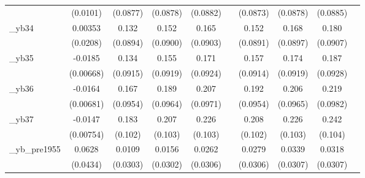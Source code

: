 \begin{table}[htbp]
\begin{tabular}{l*{9}{c}}
            &    (0.0101)         &    (0.0877)         &    (0.0878)         &    (0.0882)         &                     &    (0.0873)         &    (0.0878)         &    (0.0885)         &                     \\
[1em]
\_yb34       &     0.00353         &       0.132         &       0.152\sym{*}  &       0.165\sym{*}  &                     &       0.152\sym{*}  &       0.168\sym{*}  &       0.180\sym{**} &                     \\
            &    (0.0208)         &    (0.0894)         &    (0.0900)         &    (0.0903)         &                     &    (0.0891)         &    (0.0897)         &    (0.0907)         &                     \\
[1em]
\_yb35       &     -0.0185\sym{***}&       0.134         &       0.155\sym{*}  &       0.171\sym{*}  &                     &       0.157\sym{*}  &       0.174\sym{*}  &       0.187\sym{**} &                     \\
            &   (0.00668)         &    (0.0915)         &    (0.0919)         &    (0.0924)         &                     &    (0.0914)         &    (0.0919)         &    (0.0928)         &                     \\
[1em]
\_yb36       &     -0.0164\sym{**} &       0.167\sym{*}  &       0.189\sym{*}  &       0.207\sym{**} &                     &       0.192\sym{**} &       0.206\sym{**} &       0.219\sym{**} &                     \\
            &   (0.00681)         &    (0.0954)         &    (0.0964)         &    (0.0971)         &                     &    (0.0954)         &    (0.0965)         &    (0.0982)         &                     \\
[1em]
\_yb37       &     -0.0147\sym{*}  &       0.183\sym{*}  &       0.207\sym{**} &       0.226\sym{**} &                     &       0.208\sym{**} &       0.226\sym{**} &       0.242\sym{**} &                     \\
            &   (0.00754)         &     (0.102)         &     (0.103)         &     (0.103)         &                     &     (0.102)         &     (0.103)         &     (0.104)         &                     \\
[1em]
\_yb\_pre1955 &      0.0628         &      0.0109         &      0.0156         &      0.0262         &                     &      0.0279         &      0.0339         &      0.0318         &                     \\
            &    (0.0434)         &    (0.0303)         &    (0.0302)         &    (0.0306)         &                     &    (0.0306)         &    (0.0307)         &    (0.0307)         &                     \\

\end{tabular}
\end{table}
